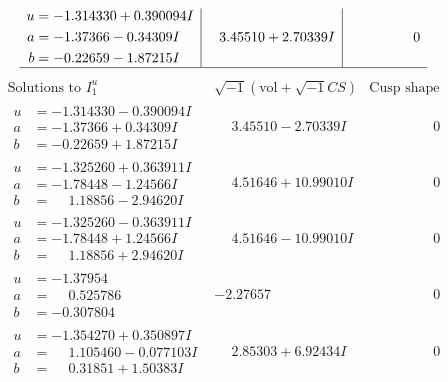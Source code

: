 \documentclass[1p]{elsarticle_modified}
\theoremstyle{definition}
\newcommand{\I}{\sqrt{-1}}
\begin{document}
$$\begin{array}{c|c|c}
\begin{aligned}
u &= -1.314330 + 0.390094 I \\
a &= -1.37366 - 0.34309 I \\
b &= -0.22659 - 1.87215 I\end{aligned}
 & \phantom{-}3.45510 + 2.70339 I & \phantom{-0.000000 } 0\\
 \hline 
 \end{array}$$\newpage$$\begin{array}{c|c|c}  
\text{Solutions to }I^u_{1}& \I (\text{vol} + \sqrt{-1}CS) & \text{Cusp shape}\\
 \hline 
\begin{aligned}
u &= -1.314330 - 0.390094 I \\
a &= -1.37366 + 0.34309 I \\
b &= -0.22659 + 1.87215 I\end{aligned}
 & \phantom{-}3.45510 - 2.70339 I & \phantom{-0.000000 } 0 \\ \hline\begin{aligned}
u &= -1.325260 + 0.363911 I \\
a &= -1.78448 - 1.24566 I \\
b &= \phantom{-}1.18856 - 2.94620 I\end{aligned}
 & \phantom{-}4.51646 + 10.99010 I & \phantom{-0.000000 } 0 \\ \hline\begin{aligned}
u &= -1.325260 - 0.363911 I \\
a &= -1.78448 + 1.24566 I \\
b &= \phantom{-}1.18856 + 2.94620 I\end{aligned}
 & \phantom{-}4.51646 - 10.99010 I & \phantom{-0.000000 } 0 \\ \hline\begin{aligned}
u &= -1.37954\phantom{ +0.000000I} \\
a &= \phantom{-}0.525786\phantom{ +0.000000I} \\
b &= -0.307804\phantom{ +0.000000I}\end{aligned}
 & -2.27657\phantom{ +0.000000I} & \phantom{-0.000000 } 0 \\ \hline\begin{aligned}
u &= -1.354270 + 0.350897 I \\
a &= \phantom{-}1.105460 - 0.077103 I \\
b &= \phantom{-}0.31851 + 1.50383 I\end{aligned}
 & \phantom{-}2.85303 + 6.92434 I & \phantom{-0.000000 } 0 \\ \hline\begin{aligned}

\end{aligned}
\end{array}$$
\end{document}
